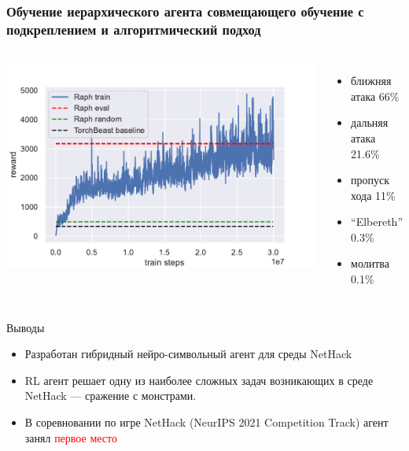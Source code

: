 \begin{frame}
\frametitle{Обучение иерархического агента совмещающего обучение с подкреплением и алгоритмический подход}
\begin{columns}
\centering
\includegraphics[width=1\linewidth]{images/raph_train.pdf}
\begin{itemize}
    \item ближняя атака 66\%
    \item дальняя атака 21.6\%
    \item пропуск хода 11\%
    \item ``Elbereth'' 0.3\%
    \item молитва 0.1\%
\end{itemize}
\end{columns}
\end{frame}


\begin{frame}{Выводы}
\begin{itemize}
    \item Разработан гибридный нейро-символьный агент для среды NetHack
    \item RL агент решает одну из наиболее сложных задач возникающих в среде NetHack — сражение с монстрами.
    \item В соревновании по игре NetHack (NeurIPS 2021 Competition Track) агент занял \textcolor{red}{первое место}
\end{itemize}
    
\end{frame}



